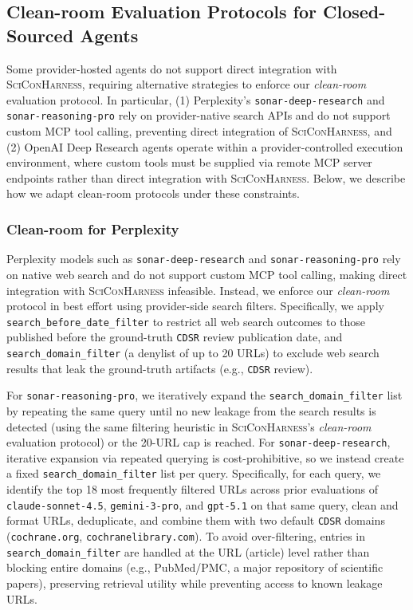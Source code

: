 \documentclass{article}
\begin{document}
\subsection{Clean-room Evaluation Protocols for Closed-Sourced Agents}\label{appendix:closed-sourced}

Some provider-hosted agents do not support direct integration with \textsc{SciConHarness}, requiring alternative strategies to enforce our \textit{clean-room} evaluation protocol. In particular, (1) Perplexity's \texttt{sonar-deep-research} and \texttt{sonar-reasoning-pro} rely on provider-native search APIs and do not support custom MCP tool calling, preventing direct integration of \textsc{SciConHarness}, and (2) OpenAI Deep Research agents operate within a provider-controlled execution environment, where custom tools must be supplied via remote MCP server endpoints rather than direct integration with \textsc{SciConHarness}. Below, we describe how we adapt clean-room protocols under these constraints.

\subsubsection{Clean-room for Perplexity}
Perplexity models such as \texttt{sonar-deep-research} and \texttt{sonar-reasoning-pro} rely on native web search and do not support custom MCP tool calling, making direct integration with \textsc{SciConHarness} infeasible. Instead, we enforce our \textit{clean-room} protocol in best effort using provider-side search filters. Specifically, we apply \texttt{search\_before\_date\_filter} to restrict all web search outcomes to those published before the ground-truth \texttt{CDSR} review publication date, and \texttt{search\_domain\_filter} (a denylist of up to 20 URLs) to exclude web search results that leak the ground-truth artifacts (e.g., \texttt{CDSR} review). 


For \texttt{sonar-reasoning-pro}, we iteratively expand the \texttt{search\_domain\_filter} list by repeating the same query until no new leakage from the search results is detected (using the same filtering heuristic in \textsc{SciConHarness}'s \textit{clean-room} evaluation protocol) or the 20-URL cap is reached. For \texttt{sonar-deep-research}, iterative expansion via repeated querying is cost-prohibitive, so we instead create a fixed \texttt{search\_domain\_filter} list per query. Specifically, for each query, we identify the top 18 most frequently filtered URLs across prior evaluations of \texttt{claude-sonnet-4.5}, \texttt{gemini-3-pro}, and \texttt{gpt-5.1} on that same query, clean and format URLs, deduplicate, and combine them with two default \texttt{CDSR} domains (\texttt{cochrane.org}, \texttt{cochranelibrary.com}). To avoid over-filtering, entries in \texttt{search\_domain\_filter} are handled at the URL (article) level rather than blocking entire domains (e.g., PubMed/PMC, a major repository of scientific papers), preserving retrieval utility while preventing access to known leakage URLs.
\end{document}
